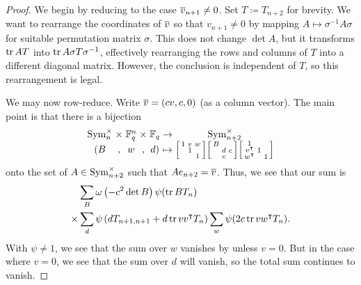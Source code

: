 \begin{proof}
    We begin by reducing to the case $\overline{v}_{n+1}\ne0$. Set $T\coloneqq T_{n+2}$ for brevity. We want to rearrange the coordinates of $\overline{v}$ so that $v_{n+1}\ne0$ by mapping $A\mapsto\sigma^{-1}A\sigma$ for suitable permutation matrix $\sigma$. This does not change $\det A$, but it transforms $\operatorname{tr} AT$ into $\operatorname{tr} A\sigma T\sigma^{-1}$, effectively rearranging the rows and columns of $T$ into a different diagonal matrix. However, the conclusion is independent of $T$, so this rearrangement is legal.

    We may now row-reduce. Write $\overline{v}=(cv,c,0)$ (as a column vector). The main point is that there is a bijection
    \[\arraycolsep=1.4pt\begin{array}{ccccccc}
        \operatorname{Sym}_{n}^\times & \times & \FF_q^{n} & \times & \FF_q & \to & \Sym_{n+2}^\times \\
        (B & , & w & , & d) & \mapsto &  \begin{bsmallmatrix}
            1 & v & w \\
                & 1 &   \\
                &   & 1
        \end{bsmallmatrix}\begin{bsmallmatrix}
            B \\
                & d & c \\
                & c
        \end{bsmallmatrix}\begin{bsmallmatrix}
            1 \\
            v^\intercal & 1 \\
            w^\intercal &   & 1
        \end{bsmallmatrix}
    \end{array}\]
    onto the set of $A\in\operatorname{Sym}_{n+2}^\times$ such that $Ae_{n+2}=\overline{v}$.
    Thus, we see that our sum is
    \begin{align*}
        &\sum_{B}\omega\left(-c^2\det B\right)\psi(\operatorname{tr} BT_n) \\
        \times{}& \sum_{d}\psi\left(dT_{n+1,n+1}+d\operatorname{tr} vv^\intercal T_n\right)\sum_{w}\psi(2c\operatorname{tr} vw^\intercal T_n).
    \end{align*}
    With $\psi\ne1$, we see that the sum over $w$ vanishes by  unless $v=0$. But in the case where $v=0$, we see that the sum over $d$ will vanish, so the total sum continues to vanish.
\end{proof}
